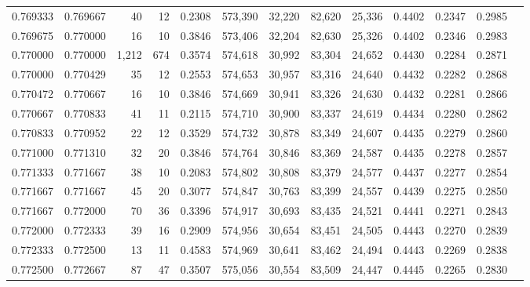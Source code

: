 \begin{tabular}{rrrrrrrrrrrrr}
0.769333 & 0.769667 &    40 &  12 &                                     0.2308 & 573,390 &  32,220 &  82,620 &  25,336 & 0.4402 & 0.2347 & 0.2985 \\
0.769675 & 0.770000 &    16 &  10 &                                     0.3846 & 573,406 &  32,204 &  82,630 &  25,326 & 0.4402 & 0.2346 & 0.2983 \\
0.770000 & 0.770000 & 1,212 & 674 &                                     0.3574 & 574,618 &  30,992 &  83,304 &  24,652 & 0.4430 & 0.2284 & 0.2871 \\
0.770000 & 0.770429 &    35 &  12 &                                     0.2553 & 574,653 &  30,957 &  83,316 &  24,640 & 0.4432 & 0.2282 & 0.2868 \\
0.770472 & 0.770667 &    16 &  10 &                                     0.3846 & 574,669 &  30,941 &  83,326 &  24,630 & 0.4432 & 0.2281 & 0.2866 \\
0.770667 & 0.770833 &    41 &  11 &                                     0.2115 & 574,710 &  30,900 &  83,337 &  24,619 & 0.4434 & 0.2280 & 0.2862 \\
0.770833 & 0.770952 &    22 &  12 &                                     0.3529 & 574,732 &  30,878 &  83,349 &  24,607 & 0.4435 & 0.2279 & 0.2860 \\
0.771000 & 0.771310 &    32 &  20 &                                     0.3846 & 574,764 &  30,846 &  83,369 &  24,587 & 0.4435 & 0.2278 & 0.2857 \\
0.771333 & 0.771667 &    38 &  10 &                                     0.2083 & 574,802 &  30,808 &  83,379 &  24,577 & 0.4437 & 0.2277 & 0.2854 \\
0.771667 & 0.771667 &    45 &  20 &                                     0.3077 & 574,847 &  30,763 &  83,399 &  24,557 & 0.4439 & 0.2275 & 0.2850 \\
0.771667 & 0.772000 &    70 &  36 &                                     0.3396 & 574,917 &  30,693 &  83,435 &  24,521 & 0.4441 & 0.2271 & 0.2843 \\
0.772000 & 0.772333 &    39 &  16 &                                     0.2909 & 574,956 &  30,654 &  83,451 &  24,505 & 0.4443 & 0.2270 & 0.2839 \\
0.772333 & 0.772500 &    13 &  11 &                                     0.4583 & 574,969 &  30,641 &  83,462 &  24,494 & 0.4443 & 0.2269 & 0.2838 \\
0.772500 & 0.772667 &    87 &  47 &                                     0.3507 & 575,056 &  30,554 &  83,509 &  24,447 & 0.4445 & 0.2265 & 0.2830 \\

\end{tabular}
